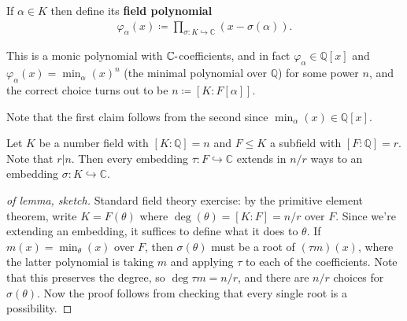 \begin{definition}

If \(\alpha\in K\) then define its \textbf{field polynomial}
\begin{align*}
\varphi_{ \alpha}(x) \coloneqq\prod_{\sigma: K\hookrightarrow{\mathbb{C}}} (x - \sigma( \alpha) )
.\end{align*}

\end{definition}

\begin{proposition}[?]

This is a monic polynomial with \({\mathbb{C}}{\hbox{-}}\)coefficients,
and in fact \(\varphi_{ \alpha} \in {\mathbb{Q}}[x]\) and
\(\varphi_{ \alpha}(x) = \min_{ \alpha} (x)^n\) (the minimal polynomial
over \({\mathbb{Q}}\)) for some power \(n\), and the correct choice
turns out to be \(n \coloneqq[K: F[ \alpha] ]\).

\end{proposition}

\begin{remark}

Note that the first claim follows from the second since
\(\min_{ \alpha}(x) \in {\mathbb{Q}}[x]\).

\end{remark}

\begin{lemma}[?]

Let \(K\) be a number field with \([K: {\mathbb{Q}}] = n\) and
\(F\leq K\) a subfield with \([F: {\mathbb{Q}}] = r\). Note that
\(r\mathrel{\Big|}n\). Then every embedding
\(\tau: F\hookrightarrow{\mathbb{C}}\) extends in \(n/r\) ways to an
embedding \(\sigma: K \hookrightarrow{\mathbb{C}}\).

\end{lemma}

\begin{proof}[of lemma, sketch]

Standard field theory exercise: by the primitive element theorem, write
\(K = F( \theta)\) where \(\deg( \theta) = [K: F] = n/r\) over \(F\).
Since we're extending an embedding, it suffices to define what it does
to \(\theta\). If \(m(x) = \min_{ \theta}(x)\) over \(F\), then
\(\sigma( \theta)\) must be a root of \((\tau m)(x)\), where the latter
polynomial is taking \(m\) and applying \(\tau\) to each of the
coefficients. Note that this preserves the degree, so
\(\deg \tau m = n/r\), and there are \(n/r\) choices for
\(\sigma( \theta)\). Now the proof follows from checking that every
single root is a possibility.

\end{proof}

